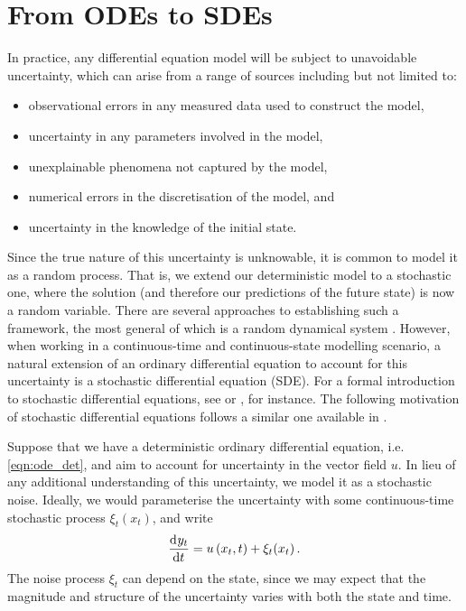 \section{From ODEs to SDEs}
In practice, any differential equation model will be subject to unavoidable uncertainty, which can arise from a range of sources including but not limited to:
\begin{itemize}
	\item observational errors in any measured data used to construct the model,
	\item uncertainty in any parameters involved in the model,
	\item unexplainable phenomena not captured by the model,
	\item numerical errors in the discretisation of the model, and
	\item uncertainty in the knowledge of the initial state.
\end{itemize}

Since the true nature of this uncertainty is unknowable, it is common to model it as a random process.
That is, we extend our deterministic model to a stochastic one, where the solution (and therefore our predictions of the future state) is now a random variable.
There are several approaches to establishing such a framework, the most general of which is a random dynamical system \citep{Arnold_1998_RandomDynamicalSystems,NeckelRupp_2013_RandomDifferentialEquations}.
However, when working in a continuous-time and continuous-state modelling scenario, a natural extension of an ordinary differential equation to account for this uncertainty is a stochastic differential equation (SDE).
For a formal introduction to stochastic differential equations, see \citet{Oksendal_2003_StochasticDifferentialEquations} or \citet{KallianpurSundar_2014_StochasticAnalysisDiffusion}, for instance.
The following motivation of stochastic differential equations follows a similar one available in \citet{Oksendal_2003_StochasticDifferentialEquations}.

Suppose that we have a deterministic ordinary differential equation, i.e. \cref{eqn:ode_det}, and aim to account for uncertainty in the vector field \(u\).
In lieu of any additional understanding of this uncertainty, we model it as a stochastic noise.
Ideally, we would parameterise the uncertainty with some continuous-time stochastic process \(\xi_t\!\left(x_t\right)\), and write
\[
	\dod{y_t}{t} = u\left(x_t, t\right) + \xi_t\!\left(x_t\right).
\]
The noise process \(\xi_t\) can depend on the state, since we may expect that the magnitude and structure of the uncertainty varies with both the state and time.


